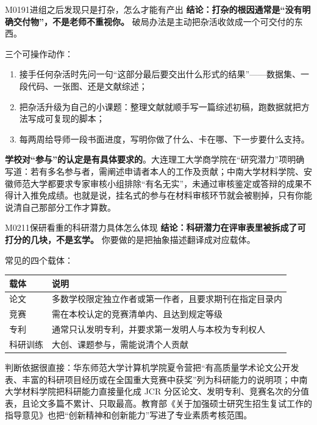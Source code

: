\begin{qa}{M0191}{进组之后发现只是打杂，怎么才能有产出}
\textbf{结论：打杂的根因通常是“没有明确交付物”，不是老师不重视你。} 破局办法是主动把杂活收敛成一个可交付的东西。

三个可操作动作：
\begin{enumerate}
  \item 接手任何杂活时先问一句“这部分最后要交出什么形式的结果”——数据集、一段代码、一张图、还是文献综述；
  \item 把杂活升级为自己的小课题：整理文献就顺手写一篇综述初稿，跑数据就把方法写成可复现的脚本；
  \item 每两周给导师一段书面进度，写明你做了什么、卡在哪、下一步要什么支持。
\end{enumerate}

\textbf{学校对“参与”的认定是有具体要求的}。大连理工大学商学院在“研究潜力”项明确写道：若有多名参与者，需阐述申请者本人的工作及贡献；中南大学材料学院、安徽师范大学都要求专家审核小组排除“有名无实”，未通过审核鉴定或答辩的成果不得计入推免成绩。也就是说，挂名式的参与在材料审核环节就会被剔掉，只有你能说清自己那部分工作才算数。
\end{qa}

\begin{qa}{M0211}{保研看重的科研潜力具体怎么体现}
\textbf{结论：科研潜力在评审表里被拆成了可打分的几块，不是玄学。} 你要做的是把抽象描述翻译成对应载体。

常见的四个载体：
\par\vspace{2pt}\nobreak\begin{center}\footnotesize
\begin{tabularx}{\textwidth}{>{\raggedright\arraybackslash}X>{\raggedright\arraybackslash}X}
\toprule
\textbf{载体} & \textbf{说明} \\ \midrule
论文 & 多数学校限定独立作者或第一作者，且要求期刊在指定目录内 \\
竞赛 & 需在本校认定的竞赛清单内、且达到规定等级 \\
专利 & 通常只认发明专利，并要求第一发明人与本校为专利权人 \\
科研训练 & 大创、课题参与，需能说清个人贡献 \\
\bottomrule
\end{tabularx}
\end{center}\vspace{2pt}\par

判断依据很直接：华东师范大学计算机学院夏令营把“有高质量学术论文公开发表、丰富的科研项目经历或在全国重大竞赛中获奖”列为科研能力的说明项；中南大学材料学院把科研能力直接量化成 JCR 分区论文、发明专利、竞赛名次的分值表，且论文多篇不累计、只取最高。教育部《关于加强硕士研究生招生复试工作的指导意见》也把“创新精神和创新能力”写进了专业素质考核范围。
\end{qa}

